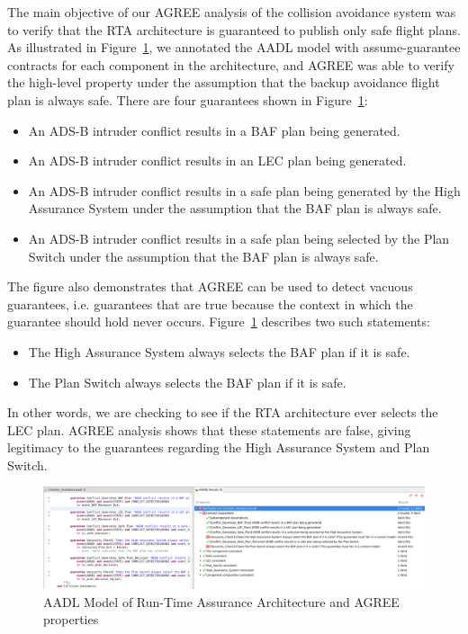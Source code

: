The main objective of our AGREE analysis of the collision avoidance system was to verify that the RTA architecture is guaranteed to publish only safe flight plans.
%
As illustrated in Figure~\ref{fig:rta-agree}, we annotated the AADL model with assume-guarantee contracts for each component in the architecture, and AGREE was able to verify the high-level property under the assumption that the backup avoidance flight plan is always safe.
There are four guarantees shown in Figure~\ref{fig:rta-agree}:
\begin{itemize}
\item An ADS-B intruder conflict results in a BAF plan being generated.
\item An ADS-B intruder conflict results in an LEC plan being generated.
\item An ADS-B intruder conflict results in a safe plan being generated by the High Assurance System under the assumption that the BAF plan is always safe.
\item An ADS-B intruder conflict results in a safe plan being selected by the Plan Switch under the assumption that the BAF plan is always safe.
\end{itemize}

The figure also demonstrates that AGREE can be used to detect vacuous guarantees, i.e. guarantees that are true because the context in which the guarantee should hold never occurs. Figure~\ref{fig:rta-agree} describes two such statements:
\begin{itemize}
\item The High Assurance System always selects the BAF plan if it is safe.
\item The Plan Switch always selects the BAF plan if it is safe.
\end{itemize}
In other words, we are checking to see if the RTA architecture ever selects the LEC plan.  AGREE analysis shows that these statements are false, giving legitimacy to the guarantees regarding the High Assurance System and Plan Switch.

\begin{figure}
	\centering
	\includegraphics[width=\textwidth]{figures/rta-agree-v2.jpg}
	\caption{AADL Model of Run-Time Assurance Architecture and AGREE properties}
	\label{fig:rta-agree}
\end{figure}
